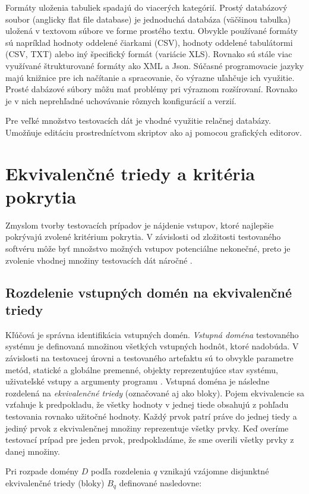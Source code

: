 Formáty uloženia tabuliek spadajú do viacerých kategórií. Prostý databázový soubor (anglicky flat file database) je jednoduchá databáza (väčšinou tabulka) uložená v textovom súbore ve forme prostého textu. Obvykle používané formáty sú napríklad hodnoty oddelené čiarkami (CSV), hodnoty oddelené tabulátormi (CSV, TXT) alebo iný špecifický formát (variácie XLS). Rovnako sú stále viac využívané štrukturované formáty ako XML a Json. Súčasné programovacie jazyky majú knižnice pre ich načítanie a spracovanie, čo výrazne uľahčuje ich využitie. Prosté dabázové súbory môžu mať problémy pri výraznom rozšírovaní. Rovnako je v nich neprehľadné uchovávanie rôznych konfigurácií a verzií. 

Pre veľké množstvo testovacích dát je vhodné využitie relačnej databázy. Umožňuje editáciu prostredníctvom skriptov ako aj pomocou grafických editorov.       
 

\section{Ekvivalenčné triedy a kritéria pokrytia}
\label{ekv_tr}
Zmyslom tvorby testovacích prípadov je nájdenie vstupov, ktoré najlepšie pokrývajú zvolené kritérium pokrytia. V závislosti od zložitosti testovaného softvéru môže byť množstvo možných vstupov  potenciálne nekonečné, preto je zvolenie vhodnej množiny testovacích dát náročné \cite{Gst}.
\subsection*{Rozdelenie vstupných domén na ekvivalenčné triedy}
Kľúčová je správna identifikácia vstupných domén. {\it Vstupná doména} testovaného systému je definovaná množinou všetkých vstupných hodnôt, ktoré nadobúda. V závislosti na testovacej úrovni a testovaného artefaktu sú to obvykle parametre metód, statické a globálne premenné, objekty reprezentujúce stav systému, uživateľské vstupy a argumenty programu \cite{Ist}. Vstupná doména je následne rozdelená na {\it ekvivalenčné triedy} (označované aj ako bloky). Pojem ekvivalencie sa vzťahuje k predpokladu, že všetky hodnoty v jednej tiede obsahujú z pohľadu testovania rovnako užitočné hodnoty. Každý prvok patrí práve do jednej tiedy a jediný prvok z ekvivalenčnej množiny reprezentuje všetky prvky. Keď overíme testovací prípad pre jeden prvok, predpokladáme, že sme overili všetky prvky z danej množiny. 

Pri rozpade domény \(D\) podľa rozdelenia \(q\) vznikajú vzájomne disjunktné ekvivalenčné triedy (bloky) \(B_{q}\)  definované nasledovne:

